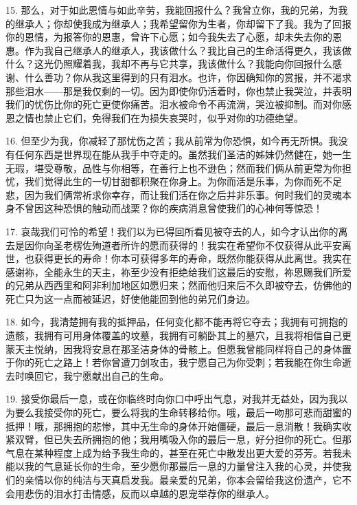 15. 那么，对于如此恩情与如此辛劳，我能回报什么？我曾立你，我的兄弟，为我的继承人；你却使我成为继承人；我希望留你为生者，你却留下了我。我为了回报你的恩情，为报答你的恩惠，曾许下心愿；如今我失去了心愿，却未失去你的恩惠。作为我自己继承人的继承人，我该做什么？我比自己的生命活得更久，我该做什么？这光仍照耀着我，我却不再与它共享，我该做什么？我能向你回报什么感谢、什么善功？你从我这里得到的只有泪水。也许，你因确知你的赏报，并不渴求那些泪水——那是我仅剩的一切。因为即使你仍活着时，你也禁止我哭泣，并表明我们的忧伤比你的死亡更使你痛苦。泪水被命令不再流淌，哭泣被抑制。而对你感恩之情也禁止它们，免得我们在为损失哀哭时，似乎对你的功德绝望。\par

16. 但至少为我，你减轻了那忧伤之苦；我从前常为你恐惧，如今再无所惧。我没有任何东西是世界现在能从我手中夺走的。虽然我们圣洁的姊妹仍然健在，她一生无瑕，堪受尊敬，品性与你相等，在善行上也不逊色；然而我们俩从前更常为你担忧，我们觉得此生的一切甘甜都积聚在你身上。为你而活是乐事，为你而死不足悲，因为我们俩常祈求你幸存，而让我们活在你之后并非乐事。何时我们的灵魂本身不曾因这种恐惧的触动而战栗？你的疾病消息曾使我们的心神何等惊恐！\par

17. 哀哉我们可怜的希望！我们以为已得回所看见被夺去的人，如今才认出你的离去是因你向圣老楞佐殉道者所许的愿而获得的！我实在希望你不仅获得从此平安离世，也获得更长的寿命！你本可获得多年的寿命，既然你能获得从此离世。我实在感谢祢，全能永生的天主，祢至少没有拒绝给我们这最后的安慰，祢恩赐我们所爱的兄弟从西西里和阿非利加地区如愿归来；然而他归来后不久即被夺去，仿佛他的死亡只为这一点而被延迟，好使他能回到他的弟兄们身边。\par

18. 如今，我清楚拥有我的抵押品，任何变化都不能再将它夺去；我拥有可拥抱的遗骸，我拥有可用身体覆盖的坟墓，我拥有可躺卧其上的墓穴，且我将相信自己更蒙天主悦纳，因我将安息在那圣洁身体的骨骸上。但愿我曾能同样将自己的身体置于你的死亡之路上！若你曾遭刀剑攻击，我宁愿自己为你受刺；若我能在你生命逝去时唤回它，我宁愿献出自己的生命。\par

19. 接受你最后一息，或在你临终时向你口中呼出气息，对我并无益处，因为我以为要么我接受你的死亡，要么将我的生命转移给你。哦，最后一吻那可悲而甜蜜的抵押！哦，那拥抱的悲惨，其中无生命的身体开始僵硬，最后一息消散！我确实收紧双臂，但已失去所拥抱的他；我用嘴吸入你的最后一息，好分担你的死亡。但那气息在某种程度上成为给予我生命的，甚至在死亡中散发出更大爱的芬芳。若我未能以我的气息延长你的生命，至少愿你那最后一息的力量曾注入我的心灵，并使我们的亲情以你的纯洁与天真启发我。最亲爱的兄弟，你本会留给我这份遗产，它不会用悲伤的泪水打击情感，反而以卓越的恩宠举荐你的继承人。\par

